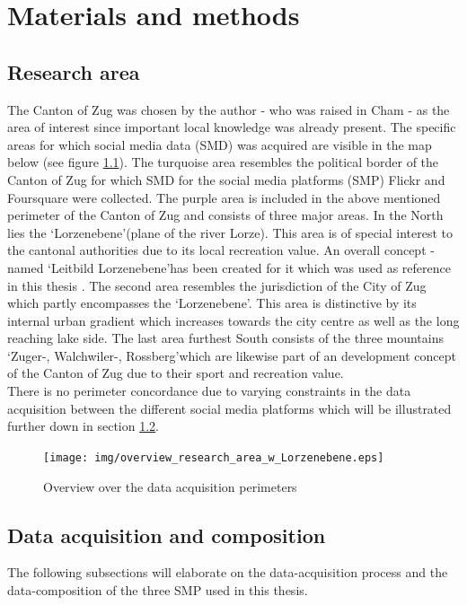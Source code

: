 \chapter{Materials and methods} \label{material_methods}

\section{Research area} \label{research_area}
The Canton of Zug was chosen by the author - who was raised in Cham - as the area of interest since important local knowledge was already present. The specific areas for which social media data (SMD) was acquired are visible in the map below (see figure \ref{fig:research_area}). The turquoise area resembles the political border of the Canton of Zug for which SMD for the social media platforms (SMP) Flickr and Foursquare were collected. The purple area is included in the above mentioned perimeter of the Canton of Zug and consists of three major areas. In the North lies the \lq Lorzenebene\rq (plane of the river Lorze). This area is of special interest to the cantonal authorities due to its local recreation value. An overall concept - named \lq Leitbild Lorzenebene\rq has been created for it which was used as reference in this thesis \cite{BaudirektiondesKantonsZug2012LeitbildBericht}. The second area resembles the jurisdiction of the City of Zug which partly encompasses the \lq Lorzenebene\rq . This area is distinctive by its internal urban gradient which increases towards the city centre as well as the long reaching lake side. The last area furthest South consists of the three mountains \lq Zuger-, Walchwiler-, Rossberg\rq which are likewise part of an development concept \cite{Berchtold2011EntwicklungsleitbildRossberg} of the Canton of Zug due to their sport and recreation value. \\
There is no perimeter concordance due to varying constraints in the data acquisition between the different social media platforms which will be illustrated further down in section \ref{data_acquisition}.

\begin{figure}[h]
   \centering
   \texttt{[image: img/overview\_research\_area\_w\_Lorzenebene.eps]}
   \caption{Overview over the data acquisition perimeters}
   \label{fig:research_area}
\end{figure}


\section{Data acquisition and composition} \label{data_acquisition}
The following subsections will elaborate on the data-acquisition process and the data-composition of the three SMP used in this thesis. 

